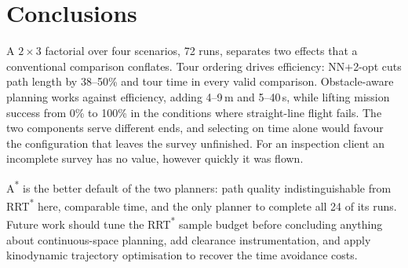 \documentclass[11pt,a4paper]{article}
\begin{document}
\section{Conclusions}

A $2\times3$ factorial over four scenarios, 72 runs, separates two effects that a conventional comparison conflates. Tour ordering drives efficiency: NN+2-opt cuts path length by 38--50\% and tour time in every valid comparison. Obstacle-aware planning works against efficiency, adding 4--9\,m and 5--40\,s, while lifting mission success from 0\% to 100\% in the conditions where straight-line flight fails. The two components serve different ends, and selecting on time alone would favour the configuration that leaves the survey unfinished. For an inspection client an incomplete survey has no value, however quickly it was flown.

A\textsuperscript{*} is the better default of the two planners: path quality indistinguishable from RRT\textsuperscript{*} here, comparable time, and the only planner to complete all 24 of its runs. Future work should tune the RRT\textsuperscript{*} sample budget before concluding anything about continuous-space planning, add clearance instrumentation, and apply kinodynamic trajectory optimisation to recover the time avoidance costs.



\end{document}
